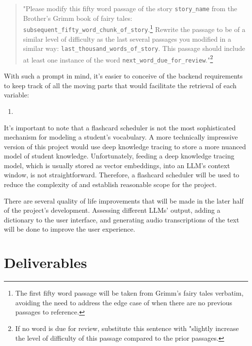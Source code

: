 \documentclass[
	letterpaper, %
]{jdf}
\newcommand{\storyname}{\texttt{story\_name}}
\newcommand{\nextfifty}{\texttt{subsequent\_fifty\_word\_chunk\_of\_story}}
\newcommand{\previousthousand}{\texttt{last\_thousand\_words\_of\_story}}
\newcommand{\nextword}{\texttt{next\_word\_due\_for\_review}}
\begin{document}
\begin{adjustwidth}{0.5in}{0.5in}
\begin{quote}
"Please modify this fifty word passage of the story \storyname{} from the Brother's Grimm book of fairy tales: \nextfifty{}.\footnote{The first fifty word passage will be taken from Grimm's fairy tales verbatim, avoiding the need to address the edge case of when there are no previous passages to reference.} Rewrite the passage to be of a similar level of difficulty as the last several passages you modified in a similar way: \previousthousand{}. This passage should include at least one instance of the word \nextword{}."\footnote{If no word is due for review, substitute this sentence with "slightly increase the level of difficulty of this passage compared to the prior passages.}
\end{quote}
\end{adjustwidth}

With such a prompt in mind, it's easier to conceive of the backend requirements to keep track of all the moving parts that would facilitate the retrieval of each variable:

\begin{enumerate}
    \item 
\end{enumerate}

It's important to note that a flashcard scheduler is not the most sophisticated mechanism for modeling a student's vocabulary. A more technically impressive version of this project would use deep knowledge tracing \cite{deep_knowledge_tracing} to store a more nuanced model of student knowledge. Unfortunately, feeding a deep knowledge tracing model, which is usually stored as vector embeddings, into an LLM's context window, is not straightforward. Therefore, a flashcard scheduler will be used to reduce the complexity of and establish reasonable scope for the project.

 
There are several quality of life improvements that will be made in the later half of the project's development. Assessing different LLMs' output, adding a dictionary to the user interface, and generating audio transcriptions of the text will be done to improve the user experience.  



\section{Deliverables}
\end{document}
